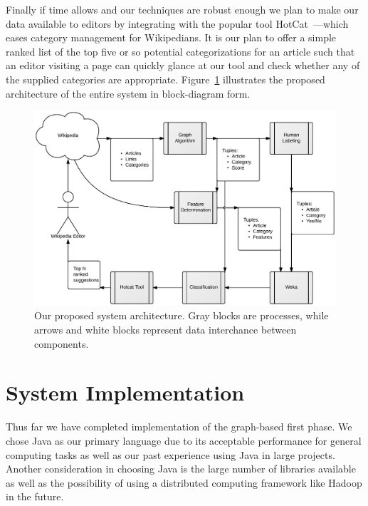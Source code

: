 \documentclass{sig-alternate}
\begin{document}
Finally if time allows and our techniques are robust enough we plan to make our data available to editors by integrating with the popular tool HotCat~\cite{HotCat}---which eases category management for Wikipedians. It is our plan to offer a simple ranked list of the top five or so potential categorizations for an article such that an editor visiting a page can quickly glance at our tool and check whether any of the supplied categories are appropriate. Figure~\ref{fig:block_diagram} illustrates the proposed architecture of the entire system in block-diagram form.
\begin{figure}[htb!]
	\begin{center}
		\includegraphics[width=1.0\linewidth]{block_diagram}
	\end{center}
	\vspace{-12pt}
	\caption{Our proposed system architecture. Gray blocks are processes, while arrows and white blocks represent data interchance between components.}
	\label{fig:block_diagram}
\end{figure}

\section{System Implementation}
\label{sec:system_implementation}

Thus far we have completed implementation of the graph-based first phase. We chose Java as our primary language due to its acceptable performance for general computing tasks as well as our past experience using Java in large projects. Another consideration in choosing Java is the large number of libraries available as well as the possibility of using a distributed computing framework like Hadoop in the future.
\end{document}
